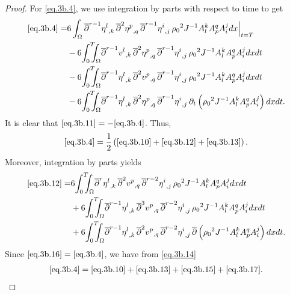 \documentclass[12pt,twoside,reqno]{amsart}
\numberwithin{equation}{section}
\theoremstyle{definition}
\theoremstyle{remark}
\begin{document}
\begin{proof}
For \eqref{eq.3b.4}, we use integration by parts with respect to time to get
\begin{align}
  \eqref{eq.3b.4}=&6\int_\Omega {{{{\overline{\partial}}^{r-1}\eta^l}}_{,{k}}\,} {{{{\overline{\partial}}^2\eta^p}}_{,{q}}\,}{{{{\overline{\partial}}^{r-1} \eta^i}}_{,{j}}\,}{\rho_0}^2 J^{-1}A^k_l A^q_p  A^j_i dx\Big|_{t=T}\label{eq.3b.10}\\
  &-6{\int_0^T\!\!\!\!\int_\Omega } {{{{\overline{\partial}}^{r-1}v^l}}_{,{k}}\,} {{{{\overline{\partial}}^2\eta^p}}_{,{q}}\,}{{{{\overline{\partial}}^{r-1} \eta^i}}_{,{j}}\,}{\rho_0}^2 J^{-1}A^k_l A^q_p  A^j_i dxdt\label{eq.3b.11}\\
  &-6{\int_0^T\!\!\!\!\int_\Omega } {{{{\overline{\partial}}^{r-1}\eta^l}}_{,{k}}\,} {{{{\overline{\partial}}^2v^p}}_{,{q}}\,}{{{{\overline{\partial}}^{r-1} \eta^i}}_{,{j}}\,}{\rho_0}^2 J^{-1}A^k_l A^q_p  A^j_i dxdt\label{eq.3b.12}\\
  &-6{\int_0^T\!\!\!\!\int_\Omega } {{{{\overline{\partial}}^{r-1}\eta^l}}_{,{k}}\,} {{{{\overline{\partial}}^2\eta^p}}_{,{q}}\,}{{{{\overline{\partial}}^{r-1} \eta^i}}_{,{j}}\,}{\partial}_t\left({\rho_0}^2 J^{-1}A^k_l A^q_p  A^j_i\right) dxdt.\label{eq.3b.13}
\end{align}
It is clear that $\eqref{eq.3b.11}=-\eqref{eq.3b.4}$. Thus,
\begin{align}
  \eqref{eq.3b.4}=\frac{1}{2}\left(\eqref{eq.3b.10}+\eqref{eq.3b.12}+\eqref{eq.3b.13}\right). \label{eq.3b.14}
\end{align}
Moreover, integration by parts yields
\begin{align}
  \eqref{eq.3b.12}=&6{\int_0^T\!\!\!\!\int_\Omega } {{{{\overline{\partial}}^r\eta^l}}_{,{k}}\,} {{{{\overline{\partial}}^2v^p}}_{,{q}}\,}{{{{\overline{\partial}}^{r-2} \eta^i}}_{,{j}}\,}{\rho_0}^2 J^{-1}A^k_l A^q_p  A^j_i dxdt\label{eq.3b.15}\\
  &+6{\int_0^T\!\!\!\!\int_\Omega } {{{{\overline{\partial}}^{r-1}\eta^l}}_{,{k}}\,} {{{{\overline{\partial}}^3v^p}}_{,{q}}\,}{{{{\overline{\partial}}^{r-2} \eta^i}}_{,{j}}\,}{\rho_0}^2 J^{-1}A^k_l A^q_p  A^j_i dxdt\label{eq.3b.16}\\
  &+6{\int_0^T\!\!\!\!\int_\Omega } {{{{\overline{\partial}}^{r-1}\eta^l}}_{,{k}}\,} {{{{\overline{\partial}}^2v^p}}_{,{q}}\,}{{{{\overline{\partial}}^{r-2} \eta^i}}_{,{j}}\,}{\overline{\partial}}\left({\rho_0}^2 J^{-1}A^k_l A^q_p  A^j_i\right) dxdt.\label{eq.3b.17}
\end{align}
Since $\eqref{eq.3b.16}=\eqref{eq.3b.4}$, we have from \eqref{eq.3b.14}
\begin{align}
  \eqref{eq.3b.4}=\eqref{eq.3b.10}+\eqref{eq.3b.13}+\eqref{eq.3b.15}+\eqref{eq.3b.17}. \label{eq.3b.18}
\end{align}


\end{proof}
\end{document}
